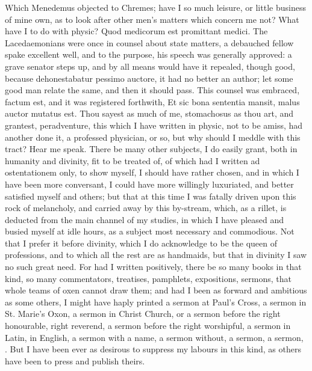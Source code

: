{Which Menedemus objected to Chremes; have I so much leisure, or little
business of mine own, as to look after other men's matters which
concern me not? What have I to do with physic? Quod medicorum est
promittant medici. The Lacedaemonians were once in counsel about
state matters, a debauched fellow spake excellent well, and to the
purpose, his speech was generally approved: a grave senator steps up,
and by all means would have it repealed, though good, because
dehonestabatur pessimo auctore, it had no better an author; let some
good man relate the same, and then it should pass. This counsel was
embraced, factum est, and it was registered forthwith, Et sic bona
sententia mansit, malus auctor mutatus est. Thou sayest as much of me,
stomachosus as thou art, and grantest, peradventure, this which I have
written in physic, not to be amiss, had another done it, a professed
physician, or so, but why should I meddle with this tract? Hear me
speak. There be many other subjects, I do easily grant, both in
humanity and divinity, fit to be treated of, of which had I written ad
ostentationem only, to show myself, I should have rather chosen, and in
which I have been more conversant, I could have more willingly
luxuriated, and better satisfied myself and others; but that at this
time I was fatally driven upon this rock of melancholy, and carried
away by this by-stream, which, as a rillet, is deducted from the main
channel of my studies, in which I have pleased and busied myself at
idle hours, as a subject most necessary and commodious. Not that I
prefer it before divinity, which I do acknowledge to be the queen of
professions, and to which all the rest are as handmaids, but that in
divinity I saw no such great need. For had I written positively, there
be so many books in that kind, so many commentators, treatises,
pamphlets, expositions, sermons, that whole teams of oxen cannot draw
them; and had I been as forward and ambitious as some others, I might
have haply printed a sermon at Paul's Cross, a sermon in St. Marie's
Oxon, a sermon in Christ Church, or a sermon before the right
honourable, right reverend, a sermon before the right worshipful, a
sermon in Latin, in English, a sermon with a name, a sermon without, a
sermon, a sermon, \etc. But I have been ever as desirous to suppress my
labours in this kind, as others have been to press and publish theirs.

}
